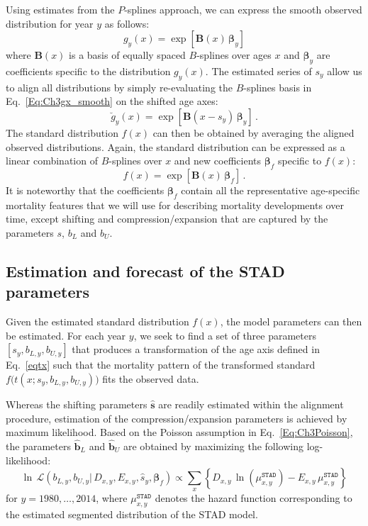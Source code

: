 \documentclass[Thesis]{subfiles}
\begin{document}
Using estimates from the $P$-splines approach, we can express the smooth observed distribution for year $y$ as follows:
% 
\begin{equation}\label{Eq:Ch3gx_smooth}
g_{y}(x) = \exp\left[ \bm{B}(x) \, \bm{\beta}_{y} \right]
\end{equation}
%
where $\bm{B}(x)$ is a basis of equally spaced $B$-splines over ages $x$ and $\bm{\beta}_{y}$ are coefficients specific to the distribution $g_{y}(x)$. The estimated series of $s_{y}$ allow us to align all distributions by simply re-evaluating the $B$-splines basis in Eq.~\eqref{Eq:Ch3gx_smooth} on the shifted age axes:
%
\begin{equation}
\breve{g}_{y}(x) = \exp\left[ \bm{B}(x - s_{y}) \, \bm{\beta}_{y}
\right] \, . 
\end{equation}
%
The standard distribution $f(x)$ can then be obtained by averaging the
aligned observed distributions. Again, the standard distribution can
be expressed as a linear combination of $B$-splines over $x$ and new
coefficients $\bm{\beta}_{f}$ specific to
$f(x)$:
% 
\begin{equation}
f(x) = \exp\left[ \bm{B}(x) \, \bm{\beta}_{f} \right] \, .
\end{equation}
%
It is noteworthy that the coefficients $\bm{\beta}_{f}$ contain all the representative age-specific mortality features that we will use for describing mortality developments
over time, except shifting and compression/expansion that are captured
by the parameters $s$, $b_{L}$ and $b_{U}$.

\subsection{Estimation and forecast of the STAD parameters}\label{Subsec:Ch3subsec2.4}

Given the estimated standard distribution $f(x)$, the model parameters can
then be estimated. For each year $y$, we seek to find a set of three parameters
$\left[s_{y}, b_{L,y}, b_{U,y} \right]$ that produces a transformation of the
age axis defined in Eq.~\eqref{eqtx} such that the mortality pattern of the transformed
standard $f\big(t(x; s_{y}, b_{L,y}, b_{U,y})\big)$ fits the observed data.   

Whereas the shifting parameters $\hat{\bm{s}}$ are readily estimated within
the alignment procedure, estimation of the
compression/expansion parameters is achieved by maximum likelihood. Based on the Poisson assumption in Eq.~\eqref{Eq:Ch3Poisson}, the parameters $\hat{\bm{b}}_{L}$ and $\hat{\bm{b}}_{U}$ are obtained by maximizing
the following log-likelihood:   
\begin{equation}\label{Eq:Ch3loglike}
\ln \, \mathcal{L}\left(b_{L,y},b_{U,y} | \, D_{x,y} , E_{x,y} , \hat{s}_{y} , \bm{\beta}_{f}
\right) \propto \sum_{x} \left \{  D_{x,y} \,
\ln \left ( \mu^{\texttt{STAD}}_{x,y}  \right ) - E_{x,y}
\, \mu^{\texttt{STAD}}_{x,y} \right \}  
\end{equation}
for $y=1980,\ldots,2014$, where $\mu^{\texttt{STAD}}_{x,y}$ denotes
the hazard function corresponding to the estimated segmented
distribution of the STAD model.
\end{document}
